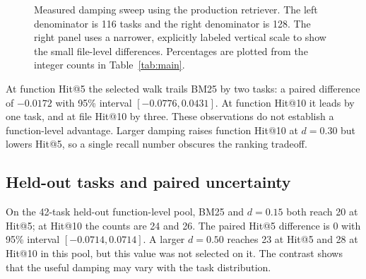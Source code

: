 \documentclass[11pt]{article}
\begin{document}
\begin{figure}[t]
\centering
\begin{minipage}{0.50\linewidth}
\centering
{}
\end{minipage}\hfill
\begin{minipage}{0.47\linewidth}
\centering
{}
\end{minipage}
\caption{Measured damping sweep using the production retriever. The left denominator is 116 tasks and the right denominator is 128. The right panel uses a narrower, explicitly labeled vertical scale to show the small file-level differences. Percentages are plotted from the integer counts in Table~\ref{tab:main}.}
\label{fig:damping}
\end{figure}

At function Hit@5 the selected walk trails BM25 by two tasks: a paired difference of $-0.0172$ with 95\% interval $[-0.0776,0.0431]$. At function Hit@10 it leads by one task, and at file Hit@10 by three. These observations do not establish a function-level advantage. Larger damping raises function Hit@10 at $d=0.30$ but lowers Hit@5, so a single recall number obscures the ranking tradeoff.

\subsection{Held-out tasks and paired uncertainty}
On the 42-task held-out function-level pool, BM25 and $d=0.15$ both reach 20 at Hit@5; at Hit@10 the counts are 24 and 26. The paired Hit@5 difference is 0 with 95\% interval $[-0.0714,0.0714]$. A larger $d=0.50$ reaches 23 at Hit@5 and 28 at Hit@10 in this pool, but this value was not selected on it. The contrast shows that the useful damping may vary with the task distribution.
\end{document}
